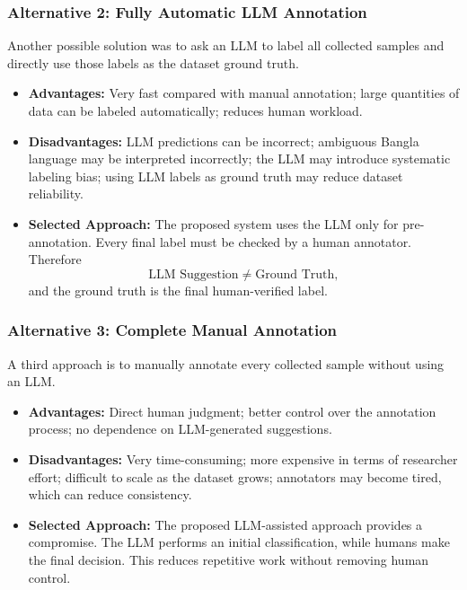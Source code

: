 \subsubsection{Alternative 2: Fully Automatic LLM Annotation}
Another possible solution was to ask an LLM to label all collected samples and
directly use those labels as the dataset ground truth.
\begin{itemize}
  \item \textbf{Advantages:} Very fast compared with manual annotation; large
        quantities of data can be labeled automatically; reduces human workload.
  \item \textbf{Disadvantages:} LLM predictions can be incorrect; ambiguous Bangla
        language may be interpreted incorrectly; the LLM may introduce systematic
        labeling bias; using LLM labels as ground truth may reduce dataset
        reliability.
  \item \textbf{Selected Approach:} The proposed system uses the LLM only for
        pre-annotation. Every final label must be checked by a human annotator.
        Therefore
        \[\text{LLM Suggestion}\neq\text{Ground Truth},\]
        and the ground truth is the final human-verified label.
\end{itemize}

\subsubsection{Alternative 3: Complete Manual Annotation}
A third approach is to manually annotate every collected sample without using an LLM.
\begin{itemize}
  \item \textbf{Advantages:} Direct human judgment; better control over the
        annotation process; no dependence on LLM-generated suggestions.
  \item \textbf{Disadvantages:} Very time-consuming; more expensive in terms of
        researcher effort; difficult to scale as the dataset grows; annotators may
        become tired, which can reduce consistency.
  \item \textbf{Selected Approach:} The proposed LLM-assisted approach provides a
        compromise. The LLM performs an initial classification, while humans make
        the final decision. This reduces repetitive work without removing human
        control.
\end{itemize}

